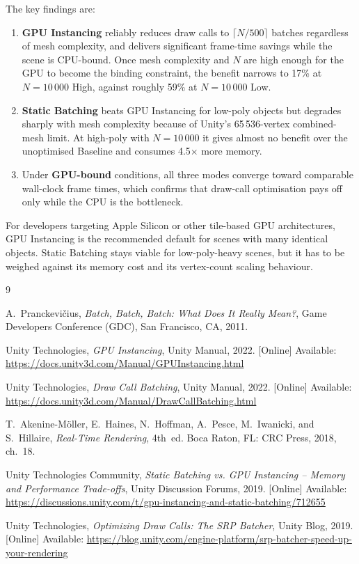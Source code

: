 \documentclass[11pt,a4paper]{article}
\begin{document}
The key findings are:
\begin{enumerate}
  \item \textbf{GPU Instancing} reliably reduces draw calls to $\lceil N/500 \rceil$
        batches regardless of mesh complexity, and delivers significant frame-time
        savings while the scene is CPU-bound. Once mesh complexity and $N$ are high
        enough for the GPU to become the binding constraint, the benefit narrows to
        17\% at $N=10\,000$ High, against roughly 59\% at $N=10\,000$ Low.
  \item \textbf{Static Batching} beats GPU Instancing for low-poly objects but degrades
        sharply with mesh complexity because of Unity's 65\,536-vertex combined-mesh
        limit. At high-poly with $N=10\,000$ it gives almost no benefit over the
        unoptimised Baseline and consumes 4.5$\times$ more memory.
  \item Under \textbf{GPU-bound} conditions, all three modes converge toward comparable
        wall-clock frame times, which confirms that draw-call optimisation pays off
        only while the CPU is the bottleneck.
\end{enumerate}

For developers targeting Apple Silicon or other tile-based GPU architectures, GPU
Instancing is the recommended default for scenes with many identical objects. Static
Batching stays viable for low-poly-heavy scenes, but it has to be weighed against its
memory cost and its vertex-count scaling behaviour.

\begin{thebibliography}{9}

  A.~Pranckevi\v{c}ius,
  \textit{Batch, Batch, Batch: What Does It Really Mean?},
  Game Developers Conference (GDC), San Francisco, CA, 2011.

  Unity Technologies,
  \textit{GPU Instancing},
  Unity Manual, 2022.
    [Online] Available: \url{https://docs.unity3d.com/Manual/GPUInstancing.html}

  Unity Technologies,
  \textit{Draw Call Batching},
  Unity Manual, 2022.
    [Online] Available: \url{https://docs.unity3d.com/Manual/DrawCallBatching.html}

  T.~Akenine-M\"oller, E.~Haines, N.~Hoffman, A.~Pesce, M.~Iwanicki, and S.~Hillaire,
  \textit{Real-Time Rendering}, 4th~ed.
  Boca Raton, FL: CRC Press, 2018, ch.~18.

  Unity Technologies Community,
  \textit{Static Batching vs. GPU Instancing -- Memory and Performance Trade-offs},
  Unity Discussion Forums, 2019.
    [Online] Available:
  \url{https://discussions.unity.com/t/gpu-instancing-and-static-batching/712655}

  Unity Technologies,
  \textit{Optimizing Draw Calls: The SRP Batcher},
  Unity Blog, 2019.
    [Online] Available:
  \url{https://blog.unity.com/engine-platform/srp-batcher-speed-up-your-rendering}

\end{thebibliography}
\end{document}
